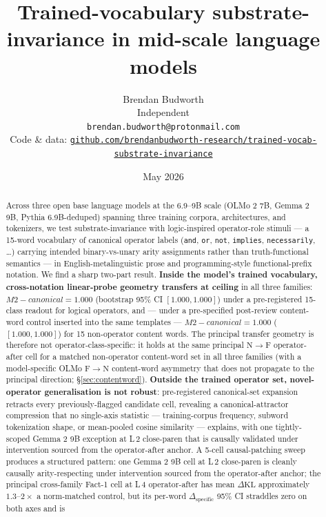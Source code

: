 \documentclass[11pt,letterpaper]{article}
\title{Trained-vocabulary substrate-invariance in mid-scale language models}
\author{%
  Brendan Budworth\\
  Independent\\
  \texttt{brendan.budworth@protonmail.com}\\[2pt]
  {\small Code \& data:
   \href{https://github.com/brendanbudworth-research/trained-vocab-substrate-invariance}%
        {\texttt{github.com/brendanbudworth-research/trained-vocab-substrate-invariance}}}%
}
\date{May 2026}
\newcommand{\dkl}{\ensuremath{\Delta\mathrm{KL}}}
\newcommand{\dspec}{\ensuremath{\Delta_{\text{specific}}}}
\newcommand{\NtoF}{\ensuremath{\mathrm{N}\!\to\!\mathrm{F}}}
\newcommand{\FtoN}{\ensuremath{\mathrm{F}\!\to\!\mathrm{N}}}
\newcommand{\Mc}{M2-canonical}
\begin{document}
\maketitle

\begin{abstract}
\noindent
Across three open base language models at the 6.9--9B scale (OLMo 2 7B,
Gemma 2 9B, Pythia 6.9B-deduped) spanning three training corpora,
architectures, and tokenizers, we test substrate-invariance with
logic-inspired operator-role stimuli --- a 15-word vocabulary of
canonical operator labels (\texttt{and}, \texttt{or}, \texttt{not},
\texttt{implies}, \texttt{necessarily}, \ldots) carrying intended
binary-vs-unary arity assignments rather than truth-functional semantics
--- in English-metalinguistic prose and programming-style
functional-prefix notation. We find a sharp two-part result.
\textbf{Inside the model's trained vocabulary, cross-notation
linear-probe geometry transfers at ceiling} in all three families:
$\Mc = 1.000$ (bootstrap 95\% CI $[1.000, 1.000]$) under a
pre-registered 15-class readout for logical operators, and --- under a
pre-specified post-review content-word control inserted into the same
templates --- $\Mc = 1.000$ ($[1.000, 1.000]$) for 15 non-operator
content words. The principal transfer geometry is therefore not
operator-class-specific: it holds at the same principal \NtoF{}
operator-after cell for a matched non-operator content-word set in all
three families (with a model-specific OLMo \FtoN{} content-word
asymmetry that does not propagate to the principal direction;
\S\ref{sec:contentword}). \textbf{Outside the trained operator set,
novel-operator generalisation is not robust}: pre-registered
canonical-set expansion retracts every previously-flagged candidate
cell, revealing a canonical-attractor compression that no single-axis
statistic --- training-corpus frequency, subword tokenization shape, or
mean-pooled cosine similarity --- explains, with one tightly-scoped
Gemma 2 9B exception at L\,2 close-paren that is causally validated
under intervention sourced from the operator-after anchor. A 5-cell
causal-patching sweep produces a structured pattern: one Gemma 2 9B
cell at L\,2 close-paren is cleanly causally arity-respecting under
intervention sourced from the operator-after anchor; the principal
cross-family Fact-1 cell at L\,4 operator-after has mean \dkl{}
approximately $1.3$--$2\times$ a norm-matched control, but its
per-word \dspec{} 95\% CI straddles zero on both axes and is

\end{abstract}
\end{document}
